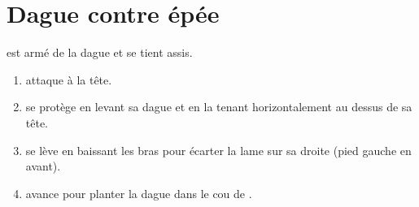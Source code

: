 \section{Dague contre épée}


\begin{technique}

\D est armé de la dague et se tient assis.

\begin{enumerate}
	\item \A attaque à la tête.
	
	\item \D se protège en levant sa dague et en la tenant horizontalement au dessus de sa tête.
	
	\item \D se lève en baissant les bras pour écarter la lame sur sa droite (pied gauche en avant).
	
	\item \D avance pour planter la dague dans le cou de \D.
\end{enumerate}

\end{technique}

